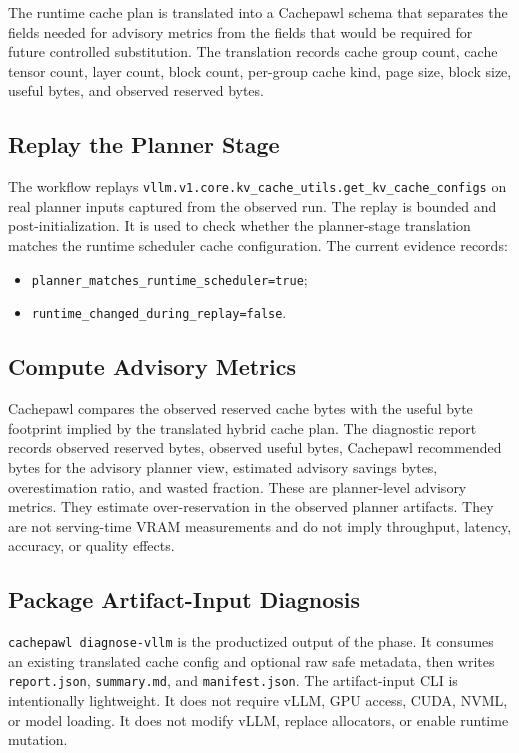 \documentclass[11pt]{article}
\begin{document}
The runtime cache plan is translated into a Cachepawl schema that separates the
fields needed for advisory metrics from the fields that would be required for
future controlled substitution. The translation records cache group count,
cache tensor count, layer count, block count, per-group cache kind, page size,
block size, useful bytes, and observed reserved bytes.

\subsection{Replay the Planner Stage}

The workflow replays \texttt{vllm.v1.core.kv\_cache\_utils.get\_kv\_cache\_configs}
on real planner inputs captured from the observed run. The replay is bounded
and post-initialization. It is used to check whether the planner-stage
translation matches the runtime scheduler cache configuration. The current
evidence records:

\begin{itemize}
\item \texttt{planner\_matches\_runtime\_scheduler=true};
\item \texttt{runtime\_changed\_during\_replay=false}.
\end{itemize}

\subsection{Compute Advisory Metrics}

Cachepawl compares the observed reserved cache bytes with the useful byte
footprint implied by the translated hybrid cache plan. The diagnostic report
records observed reserved bytes, observed useful bytes, Cachepawl recommended
bytes for the advisory planner view, estimated advisory savings bytes,
overestimation ratio, and wasted fraction. These are planner-level advisory
metrics. They estimate over-reservation in the observed planner artifacts. They
are not serving-time VRAM measurements and do not imply throughput, latency,
accuracy, or quality effects.

\subsection{Package Artifact-Input Diagnosis}

\texttt{cachepawl diagnose-vllm} is the productized output of the phase. It
consumes an existing translated cache config and optional raw safe metadata,
then writes \texttt{report.json}, \texttt{summary.md}, and
\texttt{manifest.json}. The artifact-input CLI is intentionally lightweight. It
does not require vLLM, GPU access, CUDA, NVML, or model loading. It does not
modify vLLM, replace allocators, or enable runtime mutation.
\end{document}

